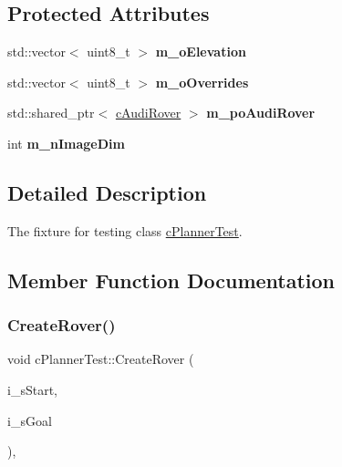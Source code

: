 \subsection*{Protected Attributes}
\begin{DoxyCompactItemize}
\item 
\mbox{\label{classc_planner_test_a2c260d30f0f5371416fe6c1824b1384b}} 
std\+::vector$<$ uint8\+\_\+t $>$ {\bfseries m\+\_\+o\+Elevation}
\item 
\mbox{\label{classc_planner_test_ad4e56282ffdb60b6b671d94ee7040f98}} 
std\+::vector$<$ uint8\+\_\+t $>$ {\bfseries m\+\_\+o\+Overrides}
\item 
\mbox{\label{classc_planner_test_a4a1c0facc16e1f7cf7e83c1ce29b8c7a}} 
std\+::shared\+\_\+ptr$<$ \mbox{\hyperlink{classplanner_1_1c_audi_rover}{c\+Audi\+Rover}} $>$ {\bfseries m\+\_\+po\+Audi\+Rover}
\item 
\mbox{\label{classc_planner_test_a1d1e9b95d362b2f8488c988e9f05583b}} 
int {\bfseries m\+\_\+n\+Image\+Dim}
\end{DoxyCompactItemize}


\subsection{Detailed Description}
The fixture for testing class \mbox{\hyperlink{classc_planner_test}{c\+Planner\+Test}}. 

\subsection{Member Function Documentation}
\mbox{\label{classc_planner_test_adc6dedb45d227191f0c87843a182d802}} 
\subsubsection{\texorpdfstring{Create\+Rover()}{CreateRover()}}
{\footnotesize\ttfamily void c\+Planner\+Test\+::\+Create\+Rover (\begin{DoxyParamCaption}\item[{const \mbox{\hyperlink{structplanner_1_1t_location}{t\+Location}} \&}]{i\+\_\+s\+Start,  }\item[{const \mbox{\hyperlink{structplanner_1_1t_location}{t\+Location}} \&}]{i\+\_\+s\+Goal }\end{DoxyParamCaption})\hspace{0.3cm}{\ttfamily [inline]}, {\ttfamily [protected]}}

